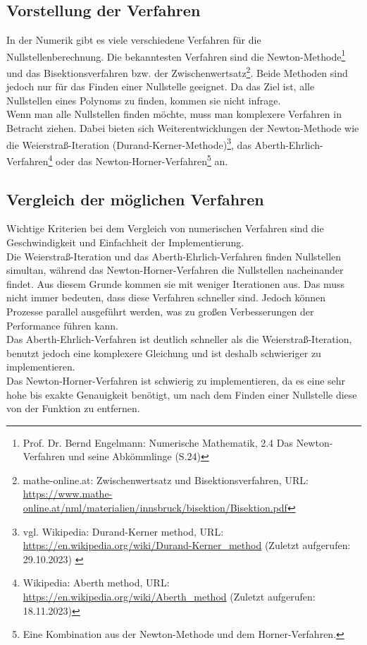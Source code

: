 \documentclass[12pt]{article}
\begin{document}
\subsection{Vorstellung der Verfahren}
In der Numerik gibt es viele verschiedene Verfahren für die Nullstellenberechnung. Die bekanntesten Verfahren sind die Newton-Methode\footnote{
    Prof. Dr. Bernd Engelmann: Numerische Mathematik, 2.4 Das Newton-Verfahren und seine Abkömmlinge (S.24)
} und das Bisektionsverfahren bzw. der Zwischenwertsatz\footnote{
    mathe-online.at: Zwischenwertsatz und Bisektionsverfahren, URL: \url{https://www.mathe-online.at/nml/materialien/innsbruck/bisektion/Bisektion.pdf}
}. Beide Methoden sind jedoch nur für das Finden einer Nullstelle geeignet. Da das Ziel ist, alle Nullstellen eines Polynoms zu finden, kommen sie nicht infrage.\\
Wenn man alle Nullstellen finden möchte, muss man komplexere Verfahren in Betracht ziehen. Dabei bieten sich Weiterentwicklungen der Newton-Methode wie die Weierstraß-Iteration (Durand-Kerner-Methode)\footnote{
    vgl. Wikipedia: Durand-Kerner method, URL: \url{https://en.wikipedia.org/wiki/Durand-Kerner_method} (Zuletzt aufgerufen: 29.10.2023)
    \label{ftn:Wikipedia-Durand-Kerner-Method}
}, das Aberth-Ehrlich-Verfahren\footnote{
    Wikipedia: Aberth method, URL: \url{https://en.wikipedia.org/wiki/Aberth_method} (Zuletzt aufgerufen: 18.11.2023)
} oder das Newton-Horner-Verfahren\footnote{
    Eine Kombination aus der Newton-Methode und dem Horner-Verfahren.
} an.

\subsection{Vergleich der möglichen Verfahren}
Wichtige Kriterien bei dem Vergleich von numerischen Verfahren sind die Geschwindigkeit und Einfachheit der Implementierung.\\
Die Weierstraß-Iteration und das Aberth-Ehrlich-Verfahren finden Nullstellen simultan, während das Newton-Horner-Verfahren die Nullstellen nacheinander findet. Aus diesem Grunde kommen sie mit weniger Iterationen aus. Das muss nicht immer bedeuten, dass diese Verfahren schneller sind. Jedoch können Prozesse parallel ausgeführt werden, was zu großen Verbesserungen der Performance führen kann.\\
Das Aberth-Ehrlich-Verfahren ist deutlich schneller als die Weierstraß-Iteration, benutzt jedoch eine komplexere Gleichung und ist deshalb schwieriger zu implementieren.\\
Das Newton-Horner-Verfahren ist schwierig zu implementieren, da es eine sehr hohe bis exakte Genauigkeit benötigt, um nach dem Finden einer Nullstelle diese von der Funktion zu entfernen.
\end{document}
